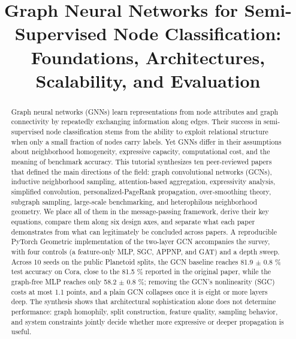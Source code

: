 \documentclass[conference]{IEEEtran}
\begin{document}
\title{Graph Neural Networks for Semi-Supervised Node Classification: Foundations, Architectures, Scalability, and Evaluation}

\author{
}

\maketitle

\begin{abstract}
Graph neural networks (GNNs) learn representations from node attributes and graph connectivity by repeatedly exchanging information along edges. Their success in semi-supervised node classification stems from the ability to exploit relational structure when only a small fraction of nodes carry labels. Yet GNNs differ in their assumptions about neighborhood homogeneity, expressive capacity, computational cost, and the meaning of benchmark accuracy. This tutorial synthesizes ten peer-reviewed papers that defined the main directions of the field: graph convolutional networks (GCNs), inductive neighborhood sampling, attention-based aggregation, expressivity analysis, simplified convolution, personalized-PageRank propagation, over-smoothing theory, subgraph sampling, large-scale benchmarking, and heterophilous neighborhood geometry. We place all of them in the message-passing framework, derive their key equations, compare them along six design axes, and separate what each paper demonstrates from what can legitimately be concluded across papers. A reproducible PyTorch Geometric implementation of the two-layer GCN accompanies the survey, with four controls (a feature-only MLP, SGC, APPNP, and GAT) and a depth sweep. Across 10 seeds on the public Planetoid splits, the GCN baseline reaches 81.9 \ensuremath{\pm} 0.8 \% test accuracy on Cora, close to the 81.5 \% reported in the original paper, while the graph-free MLP reaches only 58.2 \ensuremath{\pm} 0.8 \%; removing the GCN's nonlinearity (SGC) costs at most 1.1 points, and a plain GCN collapses once it is eight or more layers deep. The synthesis shows that architectural sophistication alone does not determine performance: graph homophily, split construction, feature quality, sampling behavior, and system constraints jointly decide whether more expressive or deeper propagation is useful.
\end{abstract}
\end{document}
